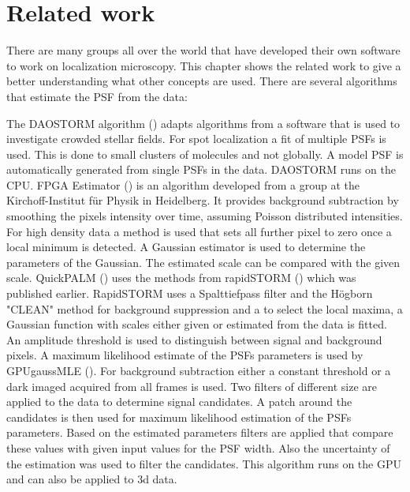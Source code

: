 \chapter{Related work}
There are many groups all over the world that have developed their own software to work on localization microscopy. This chapter shows the related work to give a better understanding what other concepts are used.\newline
There are several algorithms that estimate the PSF from the data:\newline

The DAOSTORM algorithm (\cite{DAO}) adapts algorithms from a software that is used to investigate crowded stellar fields. For spot localization a fit of multiple PSFs is used. This is done to small clusters of molecules and not globally. A model PSF is automatically generated from single PSFs in the data. DAOSTORM runs on the CPU.\newline
FPGA Estimator (\cite{simulated}) is an algorithm developed from a group at the Kirchoff-Institut f\"ur Physik in Heidelberg. It provides background subtraction by smoothing the pixels intensity over time, assuming Poisson distributed intensities. For high density data a method is used that sets all further pixel to zero once a local minimum is detected. A Gaussian estimator is used to determine the parameters of the Gaussian. The estimated scale can be compared with the given scale.\newline
QuickPALM (\cite{quickpalm}) uses the methods from rapidSTORM (\cite{rapidstorm}) which was published earlier. RapidSTORM uses a Spalttiefpass filter and the H\"ogborn "CLEAN" method for background suppression and a to select the local maxima, a Gaussian function with scales either given or estimated from the data is fitted. An amplitude threshold is used to distinguish between signal and background pixels. 
A maximum likelihood estimate of the PSFs parameters is used by GPUgaussMLE (\cite{alg3}). For background subtraction either a constant threshold or a dark imaged acquired from all frames is used. Two filters of different size are applied to the data to determine signal candidates. A patch around the candidates is then used for maximum likelihood estimation of the PSFs parameters. Based on the estimated parameters filters are applied that compare these values with given input values for the PSF width. Also the uncertainty of the estimation was used to filter the candidates. This algorithm runs on the GPU and can also be applied to 3d data.\newline

